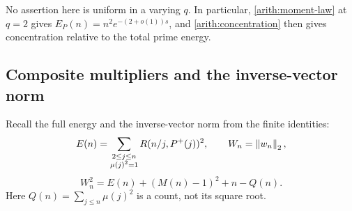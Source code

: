 No assertion here is uniform in a varying $q$. In particular,
\eqref{arith:moment-law} at $q=2$ gives
$E_P(n)=n^2e^{-(2+o(1))s}$, and \eqref{arith:concentration}
then gives concentration relative to the total prime energy.

\subsection{Composite multipliers and the inverse-vector norm}

Recall the full energy and the inverse-vector norm from the finite identities:
\[
 E(n)=\sum_{\substack{2\le j\le n\\\mu(j)^2=1}}
       R(n/j,P^+(j))^2,\qquad W_n=\left\lVert w_n\right\rVert_2,
\]
\begin{equation}\label{arith:norm-recalled}
 W_n^2=E(n)+(M(n)-1)^2+n-Q(n).
\end{equation}
Here $Q(n)=\sum_{j\le n}\mu(j)^2$ is a count, not its square root.

